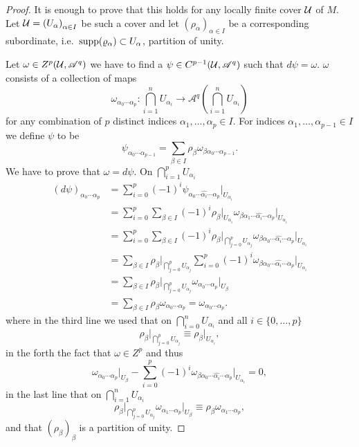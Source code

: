 \documentclass[11pt]{preprint}
\def\cA{\mathscr{A}}
\numberwithin{equation}{section}
\begin{document}
\begin{proof}
  It is enough to prove that this holds for any locally finite cover ${\mathcal U}$ of $M$. Let $\CU = \left( U_\alpha\right)_{\alpha \in I}$ be such a cover and let $\left(\rho_\alpha\right)_{\alpha \in I}$ be a corresponding subordinate, i.e.\ $\operatorname*{supp}(\varrho_\alpha) \subset U_\alpha$, partition of unity.

  Let $\omega \in Z^p(\CU, \cA^q)$ we have to find a $\psi \in C^{p-1}(\CU, \cA^q)$ such that $d \psi = \omega$. %
  $\omega$ consists of a collection of maps 
  \[
      \omega_{\alpha_0 \cdots \alpha_p} : \bigcap_{i = 1}^n U_{\alpha_i} \longrightarrow \cA^q \left( \bigcap_{i = 1}^n U_{\alpha_i} \right)
  \]
  for any combination of $p$ distinct indices $\alpha_1, \dots, \alpha_p \in I$. For indices $\alpha_1, \dots, \alpha_{p-1} \in I$ we define $\psi$ to be
  \[
    \psi_{\alpha_0 \cdots \alpha_{p-1}} = \sum_{\beta \in I} \rho_\beta \omega_{\beta\alpha_0 \cdots \alpha_{p-1}}.
  \]
  We have to prove that $\omega = d \psi$. On $\bigcap_{i = 1}^p U_{\alpha_i}$
  \begin{align*}
    \left(d \psi\right)_{\alpha_0 \cdots \alpha_{p}} &= \sum_{i = 0}^p (-1)^i \psi_{\alpha_0 \cdots \widehat{\alpha_i} \cdots \alpha_p} \big|_{U_{\alpha_i}}  \\
    & = \sum_{i = 0}^p \sum_{\beta \in I} (-1)^i \rho_\beta \big|_{U_{\alpha_i}} \omega_{\beta\alpha_1 \cdots \widehat{\alpha_i} \cdots \alpha_p} \big|_{U_{\alpha_i}}  \\
    & = \sum_{i = 0}^p \sum_{\beta \in I} (-1)^i \rho_\beta \big|_{\bigcap_{j = 0}^p U_{\alpha_j}} \omega_{\beta\alpha_0 \cdots \widehat{\alpha_i} \cdots \alpha_p} \big|_{U_{\alpha_i}}  \\
    & =  \sum_{\beta \in I} \rho_\beta \big|_{\bigcap_{j = 0}^p U_{\alpha_j}}  \sum_{i = 0}^p (-1)^i \omega_{\beta\alpha_0 \cdots \widehat{\alpha_i} \cdots \alpha_p} \big|_{U_{\alpha_i}} \\
    & = \sum_{\beta \in I} \rho_\beta \big|_{\bigcap_{j = 0}^p U_{\alpha_j}}   \omega_{\alpha_0  \cdots \alpha_p} \big|_{U_{\beta}} \\
    & = \sum_{\beta \in I} \rho_\beta  \omega_{\alpha_0  \cdots \alpha_p} =\omega_{\alpha_0  \cdots \alpha_p} .
  \end{align*}
  where in the third line we used that on $ \bigcap_{i = 0}^n U_{\alpha_i}$ and all $i \in \{0,\dots, p\}$
  \[
      \rho_\beta \big|_{\bigcap_{j = 0}^p U_{\alpha_j}} \equiv   \rho_\beta\big|_{U_{\alpha_i}} ,
  \]
  in the forth the fact that $\omega \in Z^p$ and thus 
  \[
    \omega_{\alpha_0\cdots\alpha_p}\big|_{U_\beta} - \sum_{i = 0}^p (-1)^i \omega_{\beta\alpha_0 \cdots \widehat{\alpha_i} \cdots \alpha_p} \big|_{U_{\alpha_i}} = 0,
  \]
  in the last line that on $\bigcap_{i = 1}^n U_{\alpha_i}$ 
  \[
    \rho_\beta \big|_{\bigcap_{j = 0}^p U_{\alpha_j}}   \omega_{\alpha_1  \cdots \alpha_p} \big|_{U_{\beta}} \equiv \rho_\beta  \omega_{\alpha_1  \cdots \alpha_p},
  \]
  and that $\left(\rho_\beta\right)_\beta$ is a partition of unity.
\end{proof}
\end{document}
